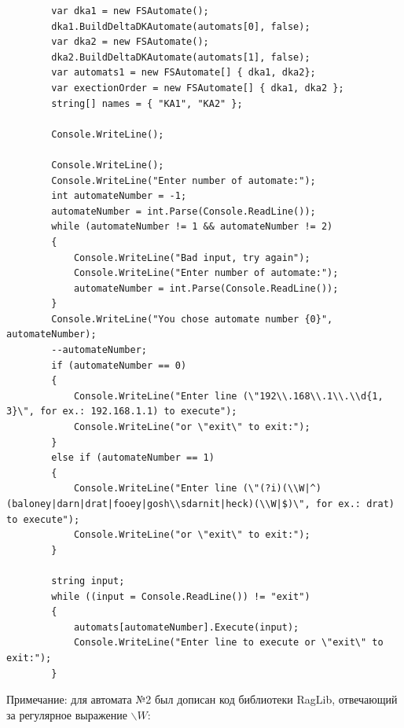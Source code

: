 \documentclass[a4paper,10pt]{article}
\begin{document}
\begin{lstlisting}
		var dka1 = new FSAutomate();
		dka1.BuildDeltaDKAutomate(automats[0], false);
		var dka2 = new FSAutomate();
		dka2.BuildDeltaDKAutomate(automats[1], false);
		var automats1 = new FSAutomate[] { dka1, dka2};
		var exectionOrder = new FSAutomate[] { dka1, dka2 };
		string[] names = { "KA1", "KA2" };
		
		Console.WriteLine();
		
		Console.WriteLine();
		Console.WriteLine("Enter number of automate:");
		int automateNumber = -1;
		automateNumber = int.Parse(Console.ReadLine());
		while (automateNumber != 1 && automateNumber != 2)
		{
			Console.WriteLine("Bad input, try again");
			Console.WriteLine("Enter number of automate:");
			automateNumber = int.Parse(Console.ReadLine());
		}
		Console.WriteLine("You chose automate number {0}", automateNumber);
		--automateNumber;
		if (automateNumber == 0)
		{
			Console.WriteLine("Enter line (\"192\\.168\\.1\\.\\d{1, 3}\", for ex.: 192.168.1.1) to execute");
			Console.WriteLine("or \"exit\" to exit:");
		}
		else if (automateNumber == 1)
		{
			Console.WriteLine("Enter line (\"(?i)(\\W|^)(baloney|darn|drat|fooey|gosh\\sdarnit|heck)(\\W|$)\", for ex.: drat) to execute");
			Console.WriteLine("or \"exit\" to exit:");
		}
		
		string input;
		while ((input = Console.ReadLine()) != "exit")
		{
			automats[automateNumber].Execute(input);
			Console.WriteLine("Enter line to execute or \"exit\" to exit:");
		}
	\end{lstlisting}
	\vspace*{5mm}
	Примечание: для автомата №2 был дописан код библиотеки RagLib, отвечающий за регулярное выражение $\backslash W$: \\
\end{document}

